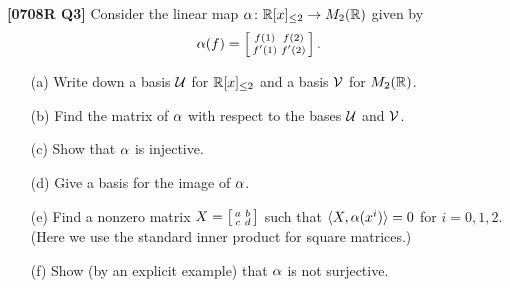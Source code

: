 \documentclass[a4paper]{article}
\begin{document}
\begin{problem}\textbf{[0708R Q3]}
 Consider the linear map $\alpha\colon{\mathbb{R}}[x]_{\leq 2}\to M_2({\mathbb{R}})$ given by 
 \[ \alpha(f) = \left[\begin{smallmatrix} f(1) & f(2) \\ f'(1) & f'(2) \end{smallmatrix}\right]. \]
 \begin{itemize}
  \item[(a)] Write down a basis $\mathcal{U}$ for ${\mathbb{R}}[x]_{\leq 2}$ and a basis
   $\mathcal{V}$ for $M_2({\mathbb{R}})$. 
  \item[(b)] Find the matrix of $\alpha$ with respect to the bases $\mathcal{U}$
   and $\mathcal{V}$. 
  \item[(c)] Show that $\alpha$ is injective. 
  \item[(d)] Give a basis for the image of $\alpha$. 
  \item[(e)] Find a nonzero matrix $X=\left[\begin{smallmatrix} a&b\\ c&d\end{smallmatrix}\right]$ such that
   $\langle X,\alpha(x^i)\rangle=0$ for $i=0,1,2$. \\
   (Here we use the standard inner product for square matrices.)
  \item[(f)] Show (by an explicit example) that $\alpha$ is not
   surjective. 
 \end{itemize}
\end{problem}
\end{document}
